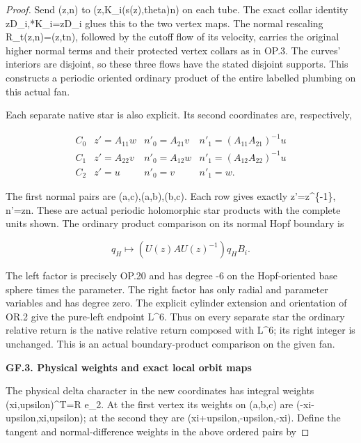 \begin{proof}
Send (z,n) to (z,K\_i(s(\textbar z\textbar),theta)n) on each tube. The exact
collar identity zD\_i,*K\_i=zD\_i glues this to the two vertex
maps. The normal rescaling R\_t(z,n)=(z,tn), followed by the
cutoff flow of its velocity, carries the original higher normal
terms and their protected vertex collars as in OP.3. The curves'
interiors are disjoint, so these three flows have the stated
disjoint supports. This constructs a periodic oriented ordinary
product of the entire labelled plumbing on this actual fan.

Each separate native star is also explicit. Its second coordinates
are, respectively,

\[
\begin{array}{c|ccc}
 C_0&z'=A_{11}w&n'_0=A_{21}v&n'_1=(A_{11}A_{21})^{-1}u\\
 C_1&z'=A_{22}v&n'_0=A_{12}w&n'_1=(A_{12}A_{22})^{-1}u\\
 C_2&z'=u&n'_0=v&n'_1=w.
\end{array}                                                   \tag{GF.11}
\]

The first normal pairs are (a,c),(a,b),(b,c). Each row gives
exactly z'=z\^{}\{-1\}, n'=zn. These are actual periodic holomorphic
star products with the complete units shown. The ordinary product
comparison on its normal Hopf boundary is

\[
              q_H\longmapsto (U(z)AU(z)^{-1})q_HB_i.
                                                               \tag{GF.12}
\]

The left factor is precisely OP.20 and has degree -6 on the
Hopf-oriented base sphere times the parameter. The right factor
has only radial and parameter variables and has degree zero.
The explicit cylinder extension and orientation of OR.2 give
the pure-left endpoint L\^{}6. Thus on every separate star the
ordinary relative return is the native relative return composed
with L\^{}6; its right integer is unchanged. This is an actual
boundary-product comparison on the given fan.

\par

\medskip\noindent\textbf{GF.3. Physical weights and exact local orbit maps}

\par\nobreak

The physical delta character in the new coordinates has integral
weights (xi,upsilon)\^{}T=R e\_2. At the first vertex its weights on
(a,b,c) are (-xi-upsilon,xi,upsilon); at the second they are
(xi+upsilon,-upsilon,-xi). Define the tangent and normal-difference
weights in the above ordered pairs by


\end{proof}
